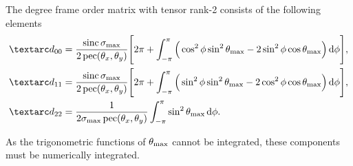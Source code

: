 
The  degree frame order matrix with tensor rank-2 consists of the following elements
\begin{subequations} \label{eq: pseudo-ellipse 1st degree frame order matrix}
\begin{align}
    \FO_{00} &= \frac{\sinc\conesmax}{2\pec(\conethetax, \conethetay)} \Bigg[
                    2\pi +
                    \int_{-\pi}^{\pi}
                        \Big( \cos^2\phi \sin^2\conethetamax - 2\sin^2\phi \cos\conethetamax \Big)
                    \diff\phi
                \Bigg] , \\
    \FO_{11} &= \frac{\sinc\conesmax}{2\pec(\conethetax, \conethetay)} \Bigg[
                    2\pi +
                    \int_{-\pi}^{\pi}
                        \Big( \sin^2\phi \sin^2\conethetamax - 2\cos^2\phi \cos\conethetamax \Big)
                    \diff\phi
                \Bigg] , \\
    \FO_{22} &= \frac{1}{2\conesmax\pec(\conethetax, \conethetay)}
                    \int_{-\pi}^{\pi}
                        \sin^2\conethetamax
                    \diff\phi .
\end{align}
\end{subequations}

As the trigonometric functions of $\theta_\textrm{max}$ cannot be integrated, these components must be numerically integrated.



